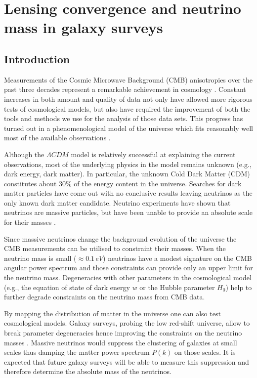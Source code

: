 \chapter{Lensing convergence and neutrino mass in galaxy surveys}
\label{chapter:7}

\section{Introduction}
\label{chapter:7:introduction}

Measurements of the Cosmic Microwave Background (CMB) anisotropies over the past three decades represent a remarkable achievement in cosmology . Constant increases in both amount and quality of data not only have allowed more rigorous tests of cosmological models, but also have required the improvement of both the tools and methods we use for the analysis of those data sets. This progress has turned out in a phenomenological model of the universe which fits reasonably well most of the available observations .    

Although the $\Lambda CDM$ model is relatively successful at explaining the current observations, most of the underlying physics in the model remains unknown (e.g., dark energy, dark matter). In particular, the unknown Cold Dark Matter (CDM) constitutes about $30\%$ of the energy content in the universe. Searches for dark matter particles have come out with no conclusive results leaving neutrinos as the only known dark matter candidate. Neutrino experiments have shown that neutrinos are massive particles, but have been unable to provide an absolute scale for their masses . 

Since massive neutrinos change the background evolution of the universe the CMB measurements can be utilised to constraint their masses. When the neutrino mass is small ($\approx 0.1 \, \mathit{eV}$) neutrinos have a modest signature on the CMB angular power spectrum and those constraints can provide only an upper limit for the neutrino mass. Degeneracies with other parameters in the cosmological model (e.g., the equation of state of dark energy $w$ or the Hubble parameter $H_0$) help to further degrade constraints on the neutrino mass from CMB data.  
   
By mapping the distribution of matter in the universe one can also test cosmological models. Galaxy surveys, probing the low red-shift universe, allow to break parameter degeneracies hence improving the constraints on the neutrino masses . Massive neutrinos would suppress the clustering of galaxies at small scales thus damping the matter power spectrum $P(k)$ on those scales. It is expected that future galaxy surveys will be able to measure this suppression and therefore determine the  absolute mass of the neutrinos.  
  
